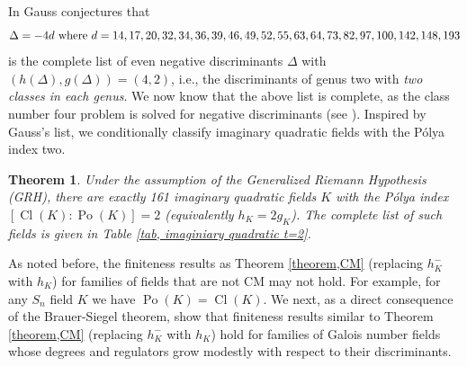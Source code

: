 \documentclass[12pt]{amsart}
\newtheorem{theorem}{Theorem}[section]
\theoremstyle{definition}
\numberwithin{equation}{section}
\DeclareMathOperator{\Po}{Po}
\DeclareMathOperator{\Cl}{Cl}
\begin{document}
In \cite[Artcile 303]{Gauss} Gauss conjectures that
$$\Delta=-4d~ {\rm where}~ d=14, 17, 20, 32, 34, 36, 39, 46, 49, 52, 55, 63, 64, 73, 82, 97, 100, 142, 148, 193$$
is the complete list of even negative discriminants $\Delta$ with $(h(\Delta), g(\Delta))=(4, 2)$, i.e., the discriminants of genus two with \textit{two classes in each genus}. We now know that the above list is complete, as the class number four problem is solved for negative discriminants (see \cite{Arno}).
Inspired by Gauss's list, 
we conditionally classify imaginary quadratic fields with the P\'{o}lya index two.
\begin{theorem}
\label{theorem, list imaginary [Cl(K):Po(K)]=2}
Under the assumption of the Generalized Riemann Hypothesis (GRH), there are exactly 161 imaginary quadratic fields $K$ with the P\'olya index $\left[ \Cl(K): \Po(K)\right]=2$ (equivalently $h_K=2g_K$). The complete list of such fields is given in Table \ref{tab, imaginiary quadratic t=2}. 
\end{theorem}
As noted before, the finiteness results as Theorem \ref{theorem,CM} (replacing $h_K^{-}$ with $h_K$) for families of fields that are not CM may not hold. For example, for any $S_n$ field $K$ we have $\Po(K)=\Cl(K)$. We next, as a direct consequence of the Brauer-Siegel theorem, show that finiteness results similar to Theorem \ref{theorem,CM} (replacing $h_K^{-}$ with $h_K$) hold for 
families of Galois number fields whose degrees and regulators grow modestly with respect to their discriminants.
\end{document}
